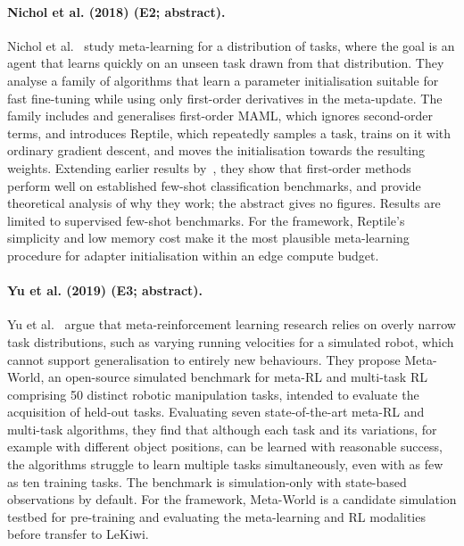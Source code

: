 \documentclass[10pt,a4paper]{article}
\begin{document}
\paragraph{Nichol et al. (2018) (E2; abstract).} Nichol et al.~\cite{Nichol2018} study meta-learning for a distribution of tasks, where the goal is an agent that learns quickly on an unseen task drawn from that distribution. They analyse a family of algorithms that learn a parameter initialisation suitable for fast fine-tuning while using only first-order derivatives in the meta-update. The family includes and generalises first-order MAML, which ignores second-order terms, and introduces Reptile, which repeatedly samples a task, trains on it with ordinary gradient descent, and moves the initialisation towards the resulting weights. Extending earlier results by~\cite{Finn2017}, they show that first-order methods perform well on established few-shot classification benchmarks, and provide theoretical analysis of why they work; the abstract gives no figures. Results are limited to supervised few-shot benchmarks. For the framework, Reptile's simplicity and low memory cost make it the most plausible meta-learning procedure for adapter initialisation within an edge compute budget.

\paragraph{Yu et al. (2019) (E3; abstract).} Yu et al.~\cite{Yu2019} argue that meta-reinforcement learning research relies on overly narrow task distributions, such as varying running velocities for a simulated robot, which cannot support generalisation to entirely new behaviours. They propose Meta-World, an open-source simulated benchmark for meta-RL and multi-task RL comprising 50 distinct robotic manipulation tasks, intended to evaluate the acquisition of held-out tasks. Evaluating seven state-of-the-art meta-RL and multi-task algorithms, they find that although each task and its variations, for example with different object positions, can be learned with reasonable success, the algorithms struggle to learn multiple tasks simultaneously, even with as few as ten training tasks. The benchmark is simulation-only with state-based observations by default. For the framework, Meta-World is a candidate simulation testbed for pre-training and evaluating the meta-learning and RL modalities before transfer to LeKiwi.
\end{document}

